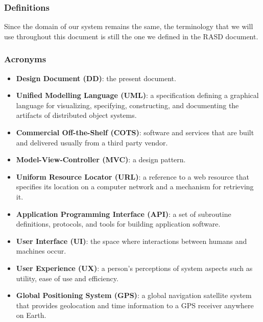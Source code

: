 \subsubsection{Definitions}

Since the domain of our system remains the same, the terminology that we will use throughout this document is still the one we defined in the RASD document.

\subsubsection{Acronyms}

\begin{itemize}
\item \textbf{Design Document (DD)}: the present document.
\item \textbf{Unified Modelling Language (UML)}: a specification defining a graphical language for visualizing, specifying, constructing, and documenting the artifacts of distributed object systems.
\item \textbf{Commercial Off-the-Shelf (COTS)}: software and services that are built and delivered usually from a third party vendor.
\item \textbf{Model-View-Controller (MVC)}: a design pattern.
\item \textbf{Uniform Resource Locator (URL)}: a reference to a web resource that specifies its location on a computer network and a mechanism for retrieving it.
\item \textbf{Application Programming Interface (API)}: a set of subroutine definitions, protocols, and tools for building application software.
\item \textbf{User Interface (UI)}: the space where interactions between humans and machines occur.
\item \textbf{User Experience (UX)}: a person’s perceptions of system aspects such as utility, ease of use and efficiency.
\item \textbf{Global Positioning System (GPS)}: a global navigation satellite system that provides geolocation and time information to a GPS receiver anywhere on Earth.
\end{itemize}


